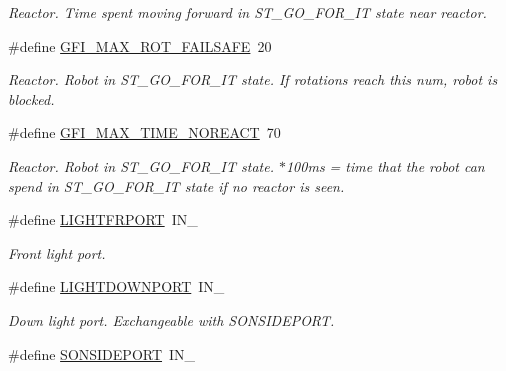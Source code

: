 \begin{DoxyCompactItemize}
\begin{DoxyCompactList}\small\item\em Reactor. Time spent moving forward in ST\_\-GO\_\-FOR\_\-IT state near reactor. \item\end{DoxyCompactList}\item 
\hypertarget{reactor_8nxc_a24ced77f76e8a86e359fd77bc1ab9ce2}{
\#define \hyperlink{reactor_8nxc_a24ced77f76e8a86e359fd77bc1ab9ce2}{GFI\_\-MAX\_\-ROT\_\-FAILSAFE}~20}
\label{reactor_8nxc_a24ced77f76e8a86e359fd77bc1ab9ce2}

\begin{DoxyCompactList}\small\item\em Reactor. Robot in ST\_\-GO\_\-FOR\_\-IT state. If rotations reach this num, robot is blocked. \item\end{DoxyCompactList}\item 
\hypertarget{reactor_8nxc_acf448a4b51caadc3612dd7fe1e6d989c}{
\#define \hyperlink{reactor_8nxc_acf448a4b51caadc3612dd7fe1e6d989c}{GFI\_\-MAX\_\-TIME\_\-NOREACT}~70}
\label{reactor_8nxc_acf448a4b51caadc3612dd7fe1e6d989c}

\begin{DoxyCompactList}\small\item\em Reactor. Robot in ST\_\-GO\_\-FOR\_\-IT state. $\ast$100ms = time that the robot can spend in ST\_\-GO\_\-FOR\_\-IT state if no reactor is seen. \item\end{DoxyCompactList}\item 
\hypertarget{reactor_8nxc_ab9d3d1049b45438591608c99774c5cba}{
\#define \hyperlink{reactor_8nxc_ab9d3d1049b45438591608c99774c5cba}{LIGHTFRPORT}~IN\_}
\label{reactor_8nxc_ab9d3d1049b45438591608c99774c5cba}

\begin{DoxyCompactList}\small\item\em Front light port. \item\end{DoxyCompactList}\item 
\hypertarget{reactor_8nxc_a5103b4e7f1559cfe1f24513bd3d797c2}{
\#define \hyperlink{reactor_8nxc_a5103b4e7f1559cfe1f24513bd3d797c2}{LIGHTDOWNPORT}~IN\_}
\label{reactor_8nxc_a5103b4e7f1559cfe1f24513bd3d797c2}

\begin{DoxyCompactList}\small\item\em Down light port. Exchangeable with SONSIDEPORT. \item\end{DoxyCompactList}\item 
\hypertarget{reactor_8nxc_a73b327cc697b593b06f47bc6915ba9cf}{
\#define \hyperlink{reactor_8nxc_a73b327cc697b593b06f47bc6915ba9cf}{SONSIDEPORT}~IN\_}
\label{reactor_8nxc_a73b327cc697b593b06f47bc6915ba9cf}


\end{DoxyCompactItemize}
